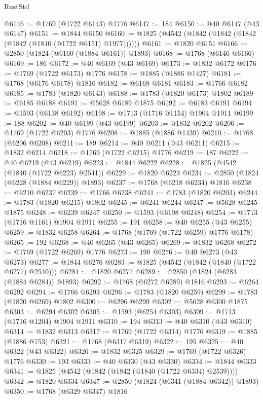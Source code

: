 \begin{lexlean}{RustStd}
\begin{coremodule}
@6146 := @1769 (@1722 @6143) @1776
@6147 := 184
@6150 := @40 @6147 (@43 @6147)
@6151 := @1844 @6150
@6160 := @1825 (@4542 (@1842 (@1842 (@1842 (@1842 (@1840 (@1722 @6151) @1977))))))
@6161 := @1820 @6151
@6166 := @2850 (@1824 (@6160 (@1884 @6161)) @1893)
@6168 := @1768 (@6146 @6166)
@6169 := 186
@6172 := @40 @6169 (@43 @6169)
@6173 := @1832 @6172
@6176 := @1769 (@1722 @6173) @1776
@6178 := @1885 (@1886 @1427)
@6181 := @1768 (@6176 @6178) @1816
@6182 := @6168 @6181
@6183 := @1766 @6182
@6185 := @1783 (@1820 @6143)
@6188 := @1783 (@1820 @6173) @1802
@6189 := @6185 @6188
@6191 := @5628 @6189 @1875
@6192 := @6183 @6191
@6194 := @1593 (@6138 @6192)
@6198 := @1713 (@1716 @1154) @1904 @1911
@6199 := 188
@6202 := @40 @6199 (@43 @6199)
@6203 := @1832 @6202
@6206 := @1769 (@1722 @6203) @1776
@6208 := @1885 (@1886 @1439)
@6210 := @1768 (@6206 @6208)
@6211 := 189
@6214 := @40 @6211 (@43 @6211)
@6215 := @1832 @6214
@6218 := @1769 (@1722 @6215) @1776
@6219 := 187
@6222 := @40 @6219 (@43 @6219)
@6223 := @1844 @6222
@6228 := @1825 (@4542 (@1840 (@1722 @6223) @2541))
@6229 := @1820 @6223
@6234 := @2850 (@1824 (@6228 (@1884 @6229)) @1893)
@6237 := @1768 (@6218 @6234) @1816
@6238 := @6210 @6237
@6239 := @1766 @6238
@6241 := @1783 (@1820 @6203)
@6244 := @1783 (@1820 @6215) @1802
@6245 := @6241 @6244
@6247 := @5628 @6245 @1875
@6248 := @6239 @6247
@6250 := @1593 (@6198 @6248)
@6254 := @1713 (@1716 @1161) @1904 @1911
@6255 := 191
@6258 := @40 @6255 (@43 @6255)
@6259 := @1832 @6258
@6264 := @1768 (@1769 (@1722 @6259) @1776 @6178)
@6265 := 192
@6268 := @40 @6265 (@43 @6265)
@6269 := @1832 @6268
@6272 := @1769 (@1722 @6269) @1776
@6273 := 190
@6276 := @40 @6273 (@43 @6273)
@6277 := @1844 @6276
@6283 := @1825 (@4542 (@1842 (@1840 (@1722 @6277) @2540)))
@6284 := @1820 @6277
@6289 := @2850 (@1824 (@6283 (@1884 @6284)) @1893)
@6292 := @1768 (@6272 @6289) @1816
@6293 := @6264 @6292
@6294 := @1766 @6293
@6296 := @1783 (@1820 @6259)
@6299 := @1783 (@1820 @6269) @1802
@6300 := @6296 @6299
@6302 := @5628 @6300 @1875
@6303 := @6294 @6302
@6305 := @1593 (@6254 @6303)
@6309 := @1713 (@1716 @1204) @1904 @1911
@6310 := 194
@6313 := @40 @6310 (@43 @6310)
@6314 := @1832 @6313
@6317 := @1769 (@1722 @6314) @1776
@6319 := @1885 (@1886 @753)
@6321 := @1768 (@6317 @6319)
@6322 := 195
@6325 := @40 @6322 (@43 @6322)
@6326 := @1832 @6325
@6329 := @1769 (@1722 @6326) @1776
@6330 := 193
@6333 := @40 @6330 (@43 @6330)
@6334 := @1844 @6333
@6341 := @1825 (@4542 (@1842 (@1842 (@1840 (@1722 @6334) @2539))))
@6342 := @1820 @6334
@6347 := @2850 (@1824 (@6341 (@1884 @6342)) @1893)
@6350 := @1768 (@6329 @6347) @1816

\end{coremodule}
\end{lexlean}
